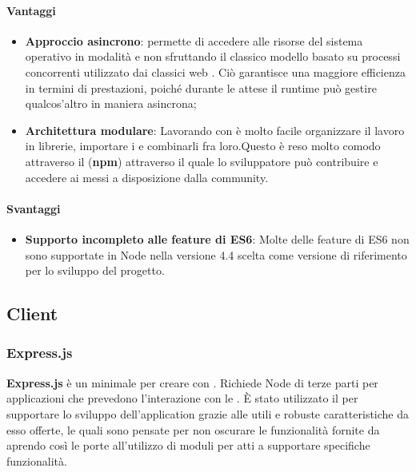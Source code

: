 \paragraph{Vantaggi} 
\begin{itemize}
\item \textbf{Approccio asincrono}:  permette di accedere alle risorse del sistema operativo in modalità  e non sfruttando il classico modello basato su processi concorrenti utilizzato dai classici web . Ciò garantisce una maggiore efficienza in termini di prestazioni, poiché durante le attese il runtime può gestire qualcos’altro in maniera asincrona;
\item \textbf{Architettura modulare}: Lavorando con  è molto facile organizzare il lavoro in librerie, importare i  e combinarli fra loro.Questo è reso molto comodo attraverso il  (\textbf{npm}) attraverso il quale lo sviluppatore può contribuire e accedere ai  messi a disposizione dalla community.
\end{itemize}

\paragraph{Svantaggi}
\begin{itemize}
\item \textbf{Supporto incompleto alle feature di ES6}: Molte delle feature di ES6 non
sono supportate in Node nella versione 4.4 scelta come versione di riferimento per
lo sviluppo del progetto.
\end{itemize}

	\subsection{Client}
	\subsubsection{Express.js}
\textbf{Express.js} è un  minimale per creare   con . Richiede  Node di terze parti per applicazioni che prevedono l'interazione con le .
È stato utilizzato il   per supportare lo sviluppo dell'application  grazie alle utili e robuste caratteristiche da esso offerte, le quali sono pensate per non oscurare le funzionalità fornite da  aprendo così le porte all'utilizzo di moduli per  atti a supportare specifiche funzionalità.

